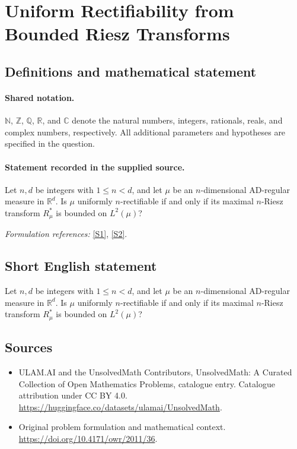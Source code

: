 \documentclass[11pt]{article}
\newcommand{\sref}[2]{\hyperlink{source:#1:#2}{[S#2]}}
\begin{document}
\section{Uniform Rectifiability from Bounded Riesz Transforms}\label{statement}

\subsection{Definitions and mathematical statement}

\paragraph{Shared notation.}$\mathbb N$, $\mathbb Z$, $\mathbb Q$, $\mathbb R$, and $\mathbb C$ denote the natural numbers, integers, rationals, reals, and complex numbers, respectively. All additional parameters and hypotheses are specified in the question.


\paragraph{Statement recorded in the supplied source.}
Let $n,d$ be integers with $1\le n<d$, and let $\mu$ be an $n$-dimensional AD-regular measure in $\mathbb R^d$. Is $\mu$ uniformly $n$-rectifiable if and only if its maximal $n$-Riesz transform $R_\mu^*$ is bounded on $L^2(\mu)$?
\par\smallskip\textit{Formulation references:} \sref{statement}{1}, \sref{statement}{2}.
\subsection{Short English statement}
Let $n,d$ be integers with $1\le n<d$, and let $\mu$ be an $n$-dimensional AD-regular measure in $\mathbb R^d$. Is $\mu$ uniformly $n$-rectifiable if and only if its maximal $n$-Riesz transform $R_\mu^*$ is bounded on $L^2(\mu)$?
\subsection{Sources}
\begin{itemize}
\item[\hypertarget{source:statement:1}{S1}] ULAM.AI and the UnsolvedMath Contributors, UnsolvedMath: A Curated Collection of Open Mathematics Problems, catalogue entry. Catalogue attribution under CC BY 4.0.
\url{https://huggingface.co/datasets/ulamai/UnsolvedMath}.
\item[\hypertarget{source:statement:2}{S2}] Original problem formulation and mathematical context.
\url{https://doi.org/10.4171/owr/2011/36}.
\end{itemize}
\label{end:statement}
\end{document}

